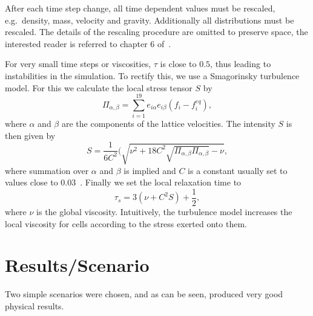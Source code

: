 \documentclass[10pt,a4paper,notitlepage]{article}
\begin{document}
After each time step change, all time dependent values must be rescaled, e.g.~density, mass, velocity and gravity.
Additionally all distributions must be rescaled.
The details of the rescaling procedure are omitted to preserve space, the interested reader is referred to chapter 6 of~\cite{thurey2007physically}.

For very small time steps or viscosities, $\tau$ is close to $0.5$, thus leading to instabilities in the simulation.
To rectify this, we use a Smagorinsky turbulence model.
For this we calculate the local stress tensor $S$ by
\begin{equation} \label{eq:stress}
\Pi_{\alpha,\beta}=\sum^{19}_{i=1}e_{i\alpha}e_{i\beta}(f_{i}-f_{i}^{eq}),
\end{equation}
where $\alpha$ and $\beta$ are the components of the lattice velocities.
 The intensity $S$ is then given by 
\begin{equation} \label{eq:intensity}
S=\frac{1}{6C^{2}}(\sqrt{\nu^{2}+18C^{2}\sqrt{\Pi_{\alpha,\beta} \Pi_{\alpha,\beta}}-\nu},
\end{equation}
where summation over $\alpha$ and $\beta$ is implied and $C$ is a constant usually set to values close to $0.03$~\cite{thurey2007physically}.
Finally we set the local relaxation time to
\begin{equation} \label{eq:relax}
\tau_s=3(\nu+C^{2}S)+\frac{1}{2},
\end{equation}
where $\nu$ is the global viscosity.
Intuitively, the turbulence model increases the local viscosity for cells according to the stress exerted onto them.

\section{Results/Scenario}
Two simple scenarios were chosen, and as can be seen, produced very good physical results.
\end{document}
